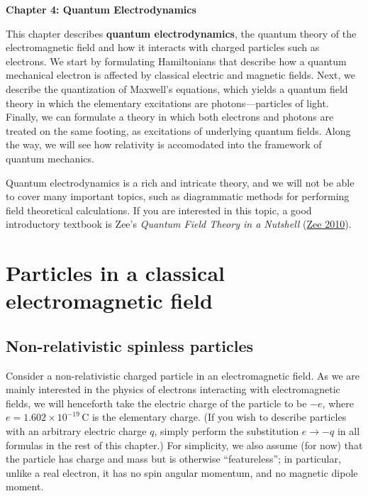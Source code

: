 \documentclass[pra,12pt]{revtex4}
\begin{document}
\begin{center}
{\Large \textbf{Chapter 4: Quantum Electrodynamics}}
\end{center}

This chapter describes \textbf{quantum electrodynamics}, the quantum
theory of the electromagnetic field and how it interacts with charged
particles such as electrons.  We start by formulating Hamiltonians
that describe how a quantum mechanical electron is affected by
classical electric and magnetic fields.  Next, we describe the
quantization of Maxwell's equations, which yields a quantum field
theory in which the elementary excitations are photons---particles of
light.  Finally, we can formulate a theory in which both electrons and
photons are treated on the same footing, as excitations of underlying
quantum fields.  Along the way, we will see how relativity is
accomodated into the framework of quantum mechanics.

Quantum electrodynamics is a rich and intricate theory, and we will
not be able to cover many important topics, such as diagrammatic
methods for performing field theoretical calculations.  If you are
interested in this topic, a good introductory textbook is Zee's
\textit{Quantum Field Theory in a Nutshell} (\hyperref[cite:zee]{Zee
  2010}).

\section{Particles in a classical electromagnetic field}

\subsection{Non-relativistic spinless particles}

Consider a non-relativistic charged particle in an electromagnetic
field.  As we are mainly interested in the physics of electrons
interacting with electromagnetic fields, we will henceforth take the
electric charge of the particle to be $-e$, where $e =
1.602\times10^{-19}\,\mathrm{C}$ is the elementary charge.  (If you
wish to describe particles with an arbitrary electric charge $q$,
simply perform the substitution $e \rightarrow -q$ in all formulas in
the rest of this chapter.)  For simplicity, we also assume (for now)
that the particle has charge and mass but is otherwise
``featureless''; in particular, unlike a real electron, it has no spin
angular momentum, and no magnetic dipole moment.
\end{document}
